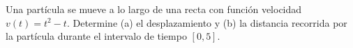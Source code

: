 \item Una partícula se mueve a lo largo de una recta con función velocidad $v(t) = t^2 - t$. Determine (a) el desplazamiento y (b) la distancia recorrida por la partícula durante el intervalo de tiempo $[0, 5]$.
